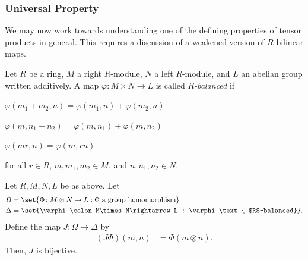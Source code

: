 \documentclass[10pt]{mypackage}
\begin{document}
\subsubsection{Universal Property}%
We may now work towards understanding one of the defining properties of tensor products in general. This requires a discussion of a weakened version of $R$-bilinear maps.
\begin{definition}
  Let $R$ be a ring, $M$ a right $R$-module, $N$ a left $R$-module, and $L$ an abelian group written additively. A map $\varphi\colon M\times N \rightarrow L$ is called \textit{$R$-balanced} if
  \begin{description}[font=\normalfont]
    \item[(BM1)] $\varphi\left( m_1 + m_2,n \right) = \varphi\left( m_1,n \right) + \varphi\left( m_2,n \right)$
    \item[(BM2)] $\varphi\left( m,n_1 + n_2 \right) = \varphi\left( m,n_1 \right) + \varphi\left( m,n_2 \right)$
    \item[(BM3)] $\varphi\left( mr,n \right) = \varphi\left( m,rn \right)$
  \end{description}
  for all $r\in R$, $m,m_1,m_2\in M$, and $n,n_1,n_2\in N$.
\end{definition}
\begin{theorem}
  Let $R,M,N,L$ be as above. Let
  \begin{align*}
    \Omega &= \set{\Phi\colon M\otimes N\rightarrow L : \Phi\text{ a group homomorphism}}\\
    \Delta &= \set{\varphi\colon M\times N\rightarrow L : \varphi\text{ $R$-balanced}}.
  \end{align*}
  Define the map $J\colon \Omega\rightarrow \Delta$ by
  \begin{align*}
    \left( J\Phi \right)(m,n) &= \Phi(m\otimes n).
  \end{align*}
  Then, $J$ is bijective.
\end{theorem}
\end{document}
